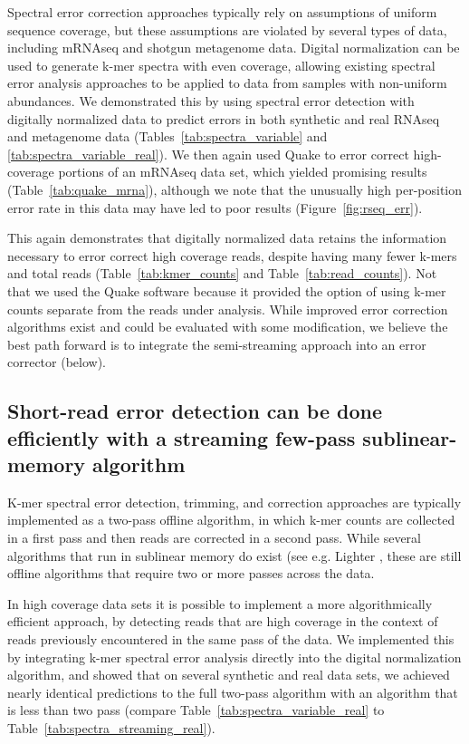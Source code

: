 \documentclass{article}
\begin{document}
Spectral error correction approaches typically rely on assumptions of
uniform sequence coverage, but these assumptions are violated by
several types of data, including mRNAseq and shotgun metagenome data.
Digital normalization can be used to generate k-mer spectra with even
coverage, allowing existing spectral error analysis approaches to be
applied to data from samples with non-uniform abundances.  We
demonstrated this by using spectral error detection with digitally
normalized data to predict errors in both synthetic and real RNAseq
and metagenome data (Tables~\ref{tab:spectra_variable} and
\ref{tab:spectra_variable_real}).  We then again used Quake to error
correct high-coverage portions of an mRNAseq data set, which yielded
promising results (Table~\ref{tab:quake_mrna}), although we note
that the unusually high per-position error rate in this data
may have led to poor results (Figure~\ref{fig:rseq_err}).

This again demonstrates that digitally normalized data retains the
information necessary to error correct high coverage reads, despite
having many fewer k-mers and total reads (Table~\ref{tab:kmer_counts}
and Table~\ref{tab:read_counts}).  Not that we used the Quake software
because it provided the option of using k-mer counts separate from the
reads under analysis.  While improved error correction algorithms
exist and could be evaluated with some modification, we believe the
best path forward is to integrate the semi-streaming approach into
an error corrector (below).

\subsection{Short-read error detection can be done efficiently with a streaming few-pass sublinear-memory algorithm}

K-mer spectral error detection, trimming, and correction approaches
are typically implemented as a two-pass offline algorithm, in which
k-mer counts are collected in a first pass and then reads are
corrected in a second pass.  While several algorithms that run in
sublinear memory do exist (see e.g. Lighter \cite{lighter}, these are
still offline algorithms that require two or more passes across
the data.

In high coverage data sets it is possible to implement a more
algorithmically efficient approach, by detecting reads that are high
coverage in the context of reads previously encountered in the same
pass of the data.  We implemented this by integrating k-mer spectral
error analysis directly into the digital normalization algorithm, and
showed that on several synthetic and real data sets, we achieved
nearly identical predictions to the full two-pass algorithm with an
algorithm that is less than two pass (compare
Table~\ref{tab:spectra_variable_real} to
Table~\ref{tab:spectra_streaming_real}).
\end{document}
